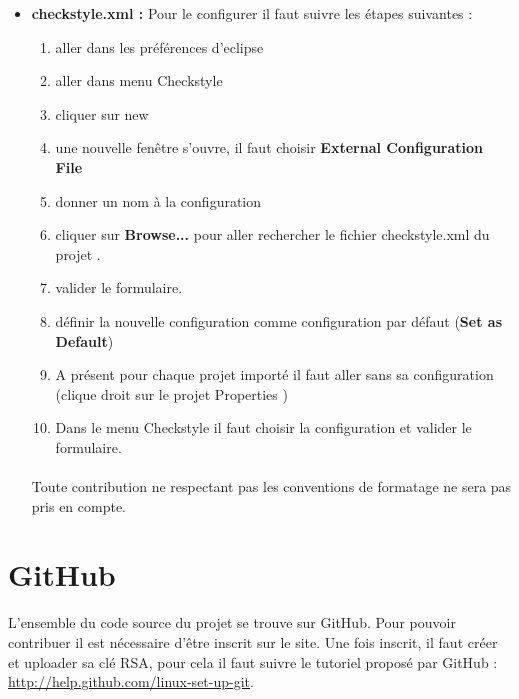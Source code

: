 \begin{itemize}
	\item  \textbf{checkstyle.xml :}
		Pour le configurer il faut suivre les étapes suivantes :
		\begin{enumerate}
				\item aller dans les préférences d'eclipse
				\item aller dans menu Checkstyle
				\item cliquer sur new
				\item une nouvelle fenêtre s'ouvre, il faut choisir \textbf{External Configuration File}
				\item donner un nom à la configuration
				\item cliquer sur \textbf{Browse...} pour aller rechercher le fichier checkstyle.xml du projet \youTestIt{}.
				\item valider le formulaire.
				\item définir la nouvelle configuration comme configuration par défaut (\textbf{Set as Default})
				\item A présent pour chaque projet importé il faut aller sans sa configuration 
							(clique droit sur le projet \rightArrow{} Properties )
				\item Dans le menu Checkstyle  il faut choisir la configuration  \youTestIt{} et valider le formulaire.
		\end{enumerate}
	

	\paragraph{}	
	
	\begin{attention}
		Toute contribution ne respectant pas les conventions de formatage ne sera pas pris en compte.
	\end{attention}
	
\end{itemize}
\section{GitHub}
L'ensemble du code source du projet se trouve sur GitHub. Pour pouvoir contribuer il est
nécessaire d’être inscrit sur le site.  Une fois inscrit, il faut créer et uploader sa clé RSA, pour cela il faut suivre le tutoriel proposé 
par GitHub : \href{http://help.github.com/linux-set-up-git/ }{http://help.github.com/linux-set-up-git}. 

